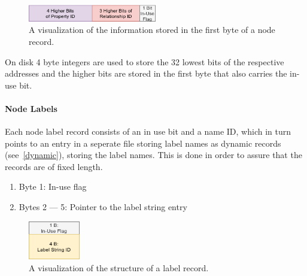 \documentclass[a4paper,10pt]{article}
\begin{document}
            \begin{figure}[htp]\label{node_first_byte}
                \begin{center}
                    \includegraphics[keepaspectratio,height=0.4\textheight,width=0.5\textwidth]{img/03_record/node/node_first_byte.png}
                \end{center}
                \caption{A visualization of the information stored in the first byte of a node record.}
            \end{figure}
        
            On disk 4 byte integers are used to store the 32 lowest bits of the respective addresses and the higher bits are stored in the first byte that also carries the in-use bit.
        
          \paragraph{Node Labels}
            Each node label record consists of an in use bit and a name ID, which in turn points to an entry in a seperate file storing label names as dynamic records (see~\ref{dynamic}), storing the label names.
            This is done in order to assure that the records are of fixed length.
            \begin{enumerate}
                \item Byte 1: In-use flag
                \item Bytes 2 --- 5: Pointer to the label string entry
            \end{enumerate}
            
            \begin{figure}[htp]\label{label_record}
                \begin{center}
                    \includegraphics[keepaspectratio,height=0.2\textheight,width=0.2\textwidth]{img/03_record/node/label_record.png}
                \end{center}
                \caption{A visualization of the structure of a label record.}
            \end{figure}
            
\end{document}
